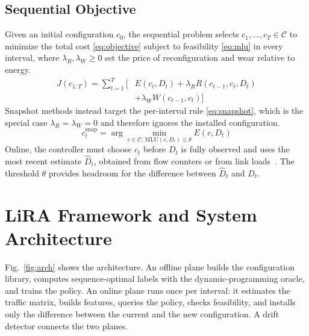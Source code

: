 \documentclass[conference]{IEEEtran}
\begin{document}
\subsection{Sequential Objective}

Given an initial configuration $c_0$, the sequential problem selects $c_1,\dots,c_T\in\mathcal{C}$ to minimize the total cost \eqref{eq:objective} subject to feasibility \eqref{eq:mlu} in every interval, where $\lambda_R,\lambda_W\ge 0$ set the price of reconfiguration and wear relative to energy.
\begin{equation}\label{eq:objective}
\begin{split}J(c_{1:T})=\sum_{t=1}^{T}\Big[&E(c_t,D_t)+\lambda_R R(c_{t-1},c_t,D_t)\\
&+\lambda_W W(c_{t-1},c_t)\Big]\end{split}
\end{equation}
Snapshot methods instead target the per-interval rule \eqref{eq:snapshot}, which is the special case $\lambda_R=\lambda_W=0$ and therefore ignores the installed configuration.
\begin{equation}\label{eq:snapshot}
c^{\mathrm{snap}}_t=\arg\min_{c\in\mathcal{C}:\,\mathrm{MLU}(c,D_t)\le\theta}E(c,D_t)
\end{equation}
Online, the controller must choose $c_t$ before $D_t$ is fully observed and uses the most recent estimate $\hat{D}_t$, obtained from flow counters or from link loads~\cite{zhang2003tomogravity}. The threshold $\theta$ provides headroom for the difference between $\hat{D}_t$ and $D_t$.

\section{LiRA Framework and System Architecture}\label{sec:framework}

Fig.~\ref{fig:arch} shows the architecture. An offline plane builds the configuration library, computes sequence-optimal labels with the dynamic-programming oracle, and trains the policy. An online plane runs once per interval: it estimates the traffic matrix, builds features, queries the policy, checks feasibility, and installs only the difference between the current and the new configuration. A drift detector connects the two planes.
\end{document}
